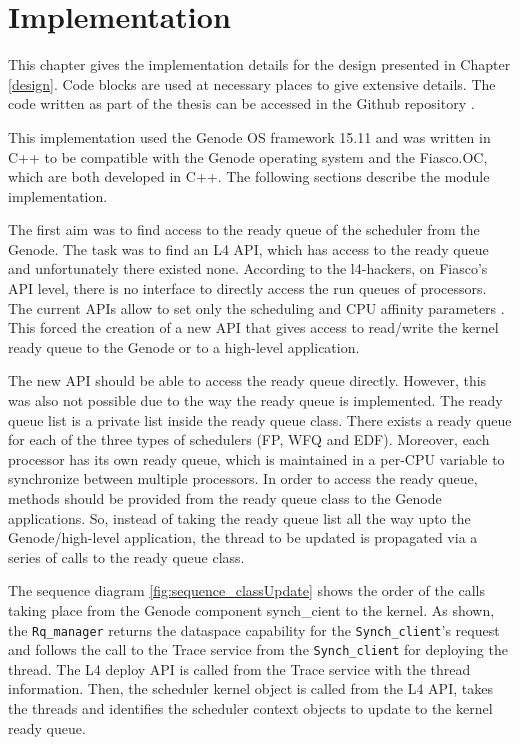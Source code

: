 \chapter{Implementation}

This chapter gives the implementation details for the design presented in Chapter \ref{design}. Code blocks are used at necessary places to give extensive details. The code written as part of the thesis can be accessed in the Github repository \cite{git_synccode}.

This implementation used the Genode OS framework 15.11 and was written in C++ to be compatible with the Genode operating system and the Fiasco.OC, which are both developed in C++. The following sections describe the module implementation.

The first aim was to find access to the ready queue of the scheduler from the Genode. The task was to find an L4 API, which has access to the ready queue and unfortunately there existed none. According to the l4-hackers, on Fiasco's API level, there is no interface to directly access the run queues of processors. The current APIs allow to set only the scheduling and CPU affinity parameters \cite{l4hack}. This forced the creation of a new API that gives access to read/write the kernel ready queue to the Genode or to a high-level application.

The new API should be able to access the ready queue directly. However, this was also not possible due to the way the ready queue is implemented. The ready queue list is a private list inside the ready queue class. There exists a ready queue for each of the three types of schedulers (FP, WFQ and EDF). Moreover, each processor has its own ready queue, which is maintained in a per-CPU variable to synchronize between multiple processors. In order to access the ready queue, methods should be provided from the ready queue class to the Genode applications. So, instead of taking the ready queue list all the way upto the Genode/high-level application, the thread to be updated is propagated via a series of calls to the ready queue class.

The sequence diagram \ref{fig:sequence_classUpdate} shows the order of the calls taking place from the Genode component synch\_cient to the kernel. As shown, the \texttt{Rq\_manager} returns the dataspace capability for the \texttt{Synch\_client}'s request and follows the call to the Trace service from the \texttt{Synch\_client} for deploying the thread. The L4 deploy API is called from the Trace service with the thread information. Then, the scheduler kernel object is called from the L4 API, takes the threads and identifies the scheduler context objects to update to the kernel ready queue.

